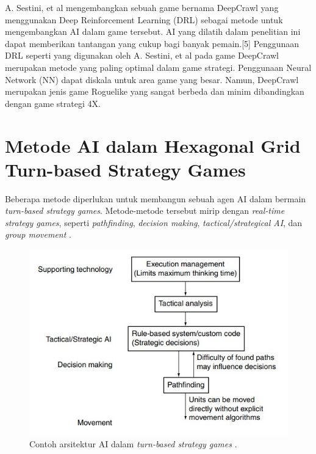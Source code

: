 A. Sestini, et al \citep{deepCrawl} mengembangkan sebuah game bernama DeepCrawl yang menggunakan Deep Reinforcement Learning (DRL) sebagai metode untuk mengembangkan AI dalam game tersebut. AI yang dilatih dalam penelitian ini dapat memberikan tantangan yang cukup bagi banyak pemain.[5] Penggunaan DRL seperti yang digunakan oleh A. Sestini, et al pada game DeepCrawl merupakan metode yang paling optimal dalam game strategi. Penggunaan Neural Network (NN) dapat diskala untuk area game yang besar. Namun, DeepCrawl merupakan jenis game Roguelike yang sangat berbeda dan minim dibandingkan dengan game strategi 4X.

\section{Metode AI dalam Hexagonal Grid Turn-based Strategy Games}
Beberapa metode diperlukan untuk membangun sebuah agen AI dalam bermain \emph{turn-based strategy games}.
Metode-metode tersebut mirip dengan \emph{real-time strategy games}, seperti \emph{pathfinding}, \emph{decision making}, \emph{tactical/strategical AI},
dan \emph{group movement} \citep{artificialInteligenceForGames}.

\begin{figure}[H]
  \centering
    \includegraphics[scale=1.2]{gambar/ai_architecture_for_turn-based_strategy_games.jpg}
    \caption{Contoh arsitektur AI dalam \emph{turn-based strategy games} \citep{artificialInteligenceForGames}.}
    \label{fig:turn-basedStrategyGamesAIArch}
\end{figure}


